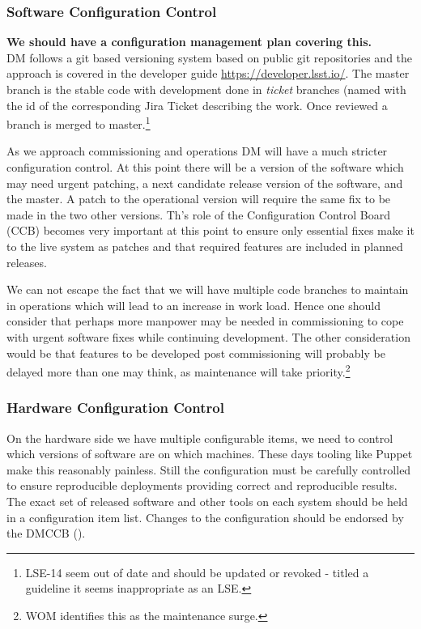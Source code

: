 \subsubsection{Software Configuration Control}
{\bf We should have a configuration management plan covering this.} \\

DM follows a git based versioning system based  on public git repositories and the approach is covered in the developer guide \url{https://developer.lsst.io/}.
The master branch is the stable code with development done in {\em ticket} branches (named with the id of the corresponding Jira Ticket describing the work. Once reviewed a branch is merged to master.\footnote{LSE-14 seem out of date and should be updated or revoked - titled a guideline it seems inappropriate as an LSE.}

As we approach commissioning and operations DM will have a much stricter configuration control. At this point there will be a version of the software which may need urgent patching, a
next candidate release version of the software, and the master. A patch to the operational version
will require the same fix to be made in the two other versions. Th's role of the Configuration Control Board (CCB) becomes very important at this point to ensure only essential fixes make it to the live system as patches and that required features are included in planned releases.


We  can not escape the fact that we  will have multiple code branches to maintain in operations which will lead to an increase in work load.
Hence one should consider that perhaps more manpower may be needed in commissioning to cope with urgent
software fixes while continuing development. The other consideration would be that features to
be developed post commissioning will probably be delayed more than one may think, as maintenance will take priority.\footnote{WOM identifies this as the maintenance surge.}

\subsubsection{Hardware Configuration Control}

On the hardware side we have multiple configurable items, we need to control which versions of software are on which machines. These days tooling like Puppet make this reasonably painless. Still the configuration  must be carefully controlled to ensure reproducible deployments providing correct and reproducible results. The exact set of released software and other tools on each system should be held in a configuration item list. 
Changes to the configuration should be endorsed by the DMCCB ().


